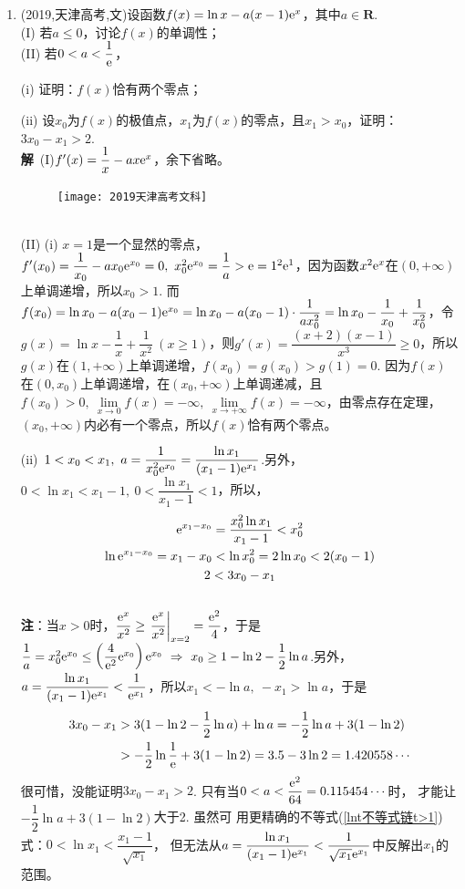 \begin{enumerate}[label={【\textbf{例\thechapter.\arabic*}】},
 leftmargin=\inteval{\myenumleftmargin}pt,
 itemsep=\inteval{\myenumitempsep}pt,
 itemindent=\inteval{\myenumitemindent}pt]
\item (2019,天津高考,文)设函数$ f(x)=\ln x-a(x-1)\mathrm{e}^x $，其中$ a\in \textbf{R} $. \\
(I) 若$ a\leq 0 $，讨论$ f(x) $的单调性；\\
(II) 若$ 0<a<\dfrac{1}{\mathrm{e}} $， 

(i) 证明：$ f(x) $恰有两个零点；

(ii) 设$ x_0 $为$ f(x) $的极值点，$ x_1 $为$ f(x) $的零点，且$ x_1>x_0 $，证明：$ 3x_0-x_1>2 $. \\
\textbf{解}\ (I)$ f'(x)=\dfrac{1}{x}-ax\mathrm{e}^x $，余下省略。
\begin{figure}[h]
	\centering
	\texttt{[image: 2019天津高考文科]}
\end{figure} \\
(II) (i) $ x=1 $是一个显然的零点，$ f'(x_0)=\dfrac{1}{x_0}-ax_0\e^{x_0}=0,\ x_0^2\e^{x_0}=\dfrac{1}{a}>\e=1^2 \e^1 $，因为函数$ x^2\mathrm{e}^x $在$ (0,+\infty) $上单调递增，所以$ x_0>1 $. 而$ f(x_0)=\ln x_0-a(x_0-1)\mathrm{e}^{x_0}=\ln x_0-a(x_0-1)\cdot \dfrac{1}{ax_0^2}=\ln x_0-\dfrac{1}{x_0}+\dfrac{1}{x_0^2} $，令$ g(x)=\ln x-\dfrac{1}{x}+\dfrac{1}{x^2}\ (x\geq 1) $，则$ g'(x)=\dfrac{(x+2)(x-1)}{x^3}\geq 0 $，所以$ g(x) $在$ (1,+\infty) $上单调递增，$ f(x_0)=g(x_0)>g(1)=0 $. 因为$ f(x) $在$ (0,x_0) $上单调递增，在$ (x_0,+\infty) $上单调递减，且$ f(x_0)>0,\ \lim\limits_{x\to 0}f(x)=-\infty,\ \lim\limits_{x\to +\infty}f(x)=-\infty $，由零点存在定理，$ (x_0,+\infty) $内必有一个零点，所以$ f(x) $恰有两个零点。

(ii)\ $ 1<x_0<x_1,\ a=\dfrac{1}{x_0^2\e^{x_0}}=
\dfrac{\ln x_1}{(x_1-1)\e^{x_1}} $.另外，$ 0<\ln x_1<x_1-1,\ 0<\dfrac{\ln x_1}{x_1-1}<1 $，所以，
\begin{gather*}
	\mathrm{e}^{x_1-x_0}=\dfrac{x_0^2\ln x_1}{x_1-1}<x_0^2 \\
	\ln \mathrm{e}^{x_1-x_0}=x_1-x_0<\ln x_0^2=2\ln x_0<2(x_0-1) \\
	2<3x_0-x_1
\end{gather*}
\\
\textbf{注}：当$ x>0 $时，$ \dfrac{\mathrm{e}^x}{x^2}\geq \left.\dfrac{\mathrm{e}^x}{x^2} \right|_{x=2} = \dfrac{\mathrm{e}^2}{4} $，于是$ \dfrac{1}{a}=x_0^2\mathrm{e}^{x_0}\leq \left(\dfrac{4}{\mathrm{e}^2}\mathrm{e}^{x_0}\right)\mathrm{e}^{x_0}\ \Rightarrow \ x_0\geq 1-\ln 2-\dfrac{1}{2}\ln a $.另外，$  a=\dfrac{\ln x_1}{(x_1-1)\mathrm{e}^{x_1}}<\dfrac{1}{\mathrm{e}^{x_1}}$，所以$ x_1<-\ln a,\ -x_1>\ln a $，于是
\begin{align*}
	3x_0-x_1&>3(1-\ln 2-\dfrac{1}{2}\ln a)+\ln a 
	=-\dfrac{1}{2}\ln a+3(1-\ln 2) \\ 
	&>-\dfrac{1}{2}\ln \dfrac{1}{\mathrm{e}}+3(1-\ln 2)
	 =3.5-3\ln2=1.420558\cdots 
\end{align*}
很可惜，没能证明$ 3x_0-x_1>2 $. 只有当$ 0<a<\dfrac{\mathrm{e}^2}{64}=0.115454\cdots $时，
才能让$ -\dfrac{1}{2}\ln a+3(1-\ln 2) $大于2. 虽然可
用更精确的不等式(\ref{lnt不等式链t>1})式：$ 0<\ln x_1<\dfrac{x_1-1}{\sqrt{x_1}} $，
但无法从$ a=\dfrac{\ln x_1}{(x_1-1)\mathrm{e}^{x_1}}<\dfrac{1}{
\sqrt{x_1}\mathrm{e}^{x_1}} $中反解出$ x_1 $的范围。


\end{enumerate}
